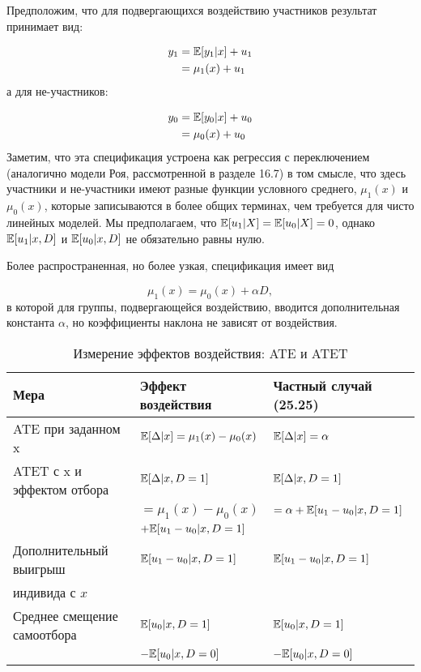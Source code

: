 Предположим, что для подвергающихся воздействию участников результат принимает вид:

\begin{align}
\label{eq25.22}
y_1 & =  \mathbb{E}[ y_1 | x]  + u_1  \\
& =  \mu_1(x) + u_1
\end{align}
а для не-участников:

\begin{align}
\label{eq25.24}
y_0 & =  \mathbb{E}[ y_0 | x]  + u_0  \\
& =  \mu_0(x) + u_0
\end{align}
Заметим, что эта спецификация устроена как регрессия с переключением (аналогично модели Роя, рассмотренной в разделе 16.7) в том смысле, что здесь участники и не-участники имеют разные функции условного среднего, $\mu_1(x)$ и $\mu_0(x)$, которые записываются в более общих терминах, чем требуется для чисто линейных моделей. Мы предполагаем, что $\mathbb{E} [u_1 | X] = \mathbb{E}[u_0 | X] = 0$, однако $\mathbb{E} [u_1 | x, D]$ и $\mathbb{E} [u_0 | x, D]$ не обязательно равны нулю. 

Более распространенная, но более узкая, спецификация имеет вид

\begin{equation}
\label{eq25.25}
\mu_1 (x) = \mu_0 (x) + \alpha D, 
\end{equation}
в которой для группы, подвергающейся воздействию, вводится дополнительная константа $\alpha$, но коэффициенты наклона не зависят от воздействия. 

\begin{table}[!h]
\caption{\label{tab:} Измерение эффектов воздействия: ATE и ATET}
\begin{center}
\begin{tabular}{lll}
\hline
\hline
Мера & Эффект воздействия & Частный случай (25.25) \\
\hline
ATE при заданном x & $\mathbb{E} [\Delta | x] = \mu_1(x) - \mu_0(x) $ & $\mathbb{E}[\Delta | x] = \alpha$ \\
ATET с x и эффектом отбора & $\mathbb{E} [\Delta | x, D = 1] $ & $\mathbb{E}[\Delta | x, D = 1]$ \\
& $ = \mu_1(x) - \mu_0(x)$ & $ = \alpha + \mathbb{E} [u_1 - u_0 | x, D = 1]$ \\
& $ + \mathbb{E}[u_1 - u_0 | x, D = 1]$ & \\

Дополнительный выигрыш & $\mathbb{E} [u_1 - u_0 | x, D = 1] $ & $\mathbb{E} [u_1 - u_0 | x, D = 1]$ \\
индивида с $x$ & & \\
Среднее смещение самоотбора & $\mathbb{E} [u_0 | x, D = 1]$ & $\mathbb{E} [u_0 | x, D = 1]$ \\
&  $ - \mathbb{E} [u_0 | x, D = 0]$ & $ - \mathbb{E} [u_0 | x, D = 0]$ \\
\hline
\hline
\end{tabular}
\end{center}
\end{table}

